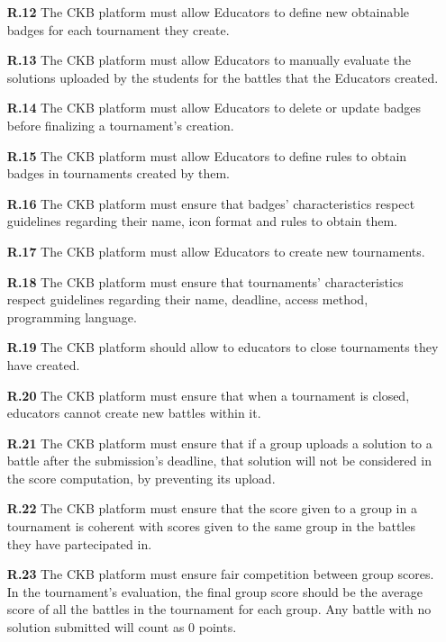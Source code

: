 \documentclass{article}
\begin{document}
{\begin{itemize}
            \item[\textbf{R.12}] The CKB platform must allow Educators to define new obtainable badges for each tournament they
            create.
            \item[\textbf{R.13}] The CKB platform must allow Educators to manually evaluate the solutions uploaded by the students for the battles that
            the Educators created.
            \item[\textbf{R.14}] The CKB platform must allow Educators to delete or update badges before finalizing a tournament's creation.
            \item[\textbf{R.15}] The CKB platform must allow Educators to define rules to obtain badges in tournaments created by them.
            \item[\textbf{R.16}] The CKB platform must ensure that badges' characteristics respect guidelines regarding their
            name, icon format and rules to obtain them.
            \item[\textbf{R.17}] The CKB platform must allow Educators to create new tournaments.
            \item[\textbf{R.18}] The CKB platform must ensure that tournaments' characteristics respect guidelines regarding their
            name, deadline, access method, programming language. 
            \item[\textbf{R.19}] The CKB platform should allow to educators to close tournaments they have created.
            \item[\textbf{R.20}] The CKB platform must ensure that when a tournament is closed, educators cannot create new battles
            within it.
            \item[\textbf{R.21}] The CKB platform must ensure that if a group uploads a solution to a battle after the submission's deadline, 
            that solution will not be considered in the score computation, by preventing its upload.
            \item[\textbf{R.22}] The CKB platform must ensure that the score given to a group in a tournament is
            coherent with scores given to the same group in the battles they have partecipated in.
            \item[\textbf{R.23}] The CKB platform must ensure fair competition between group scores. In the tournament's evaluation, the final
            group score should be the average score of all the battles in the tournament for each group. Any battle with no solution submitted will count 
            as 0 points.

\end{itemize}}
\end{document}
